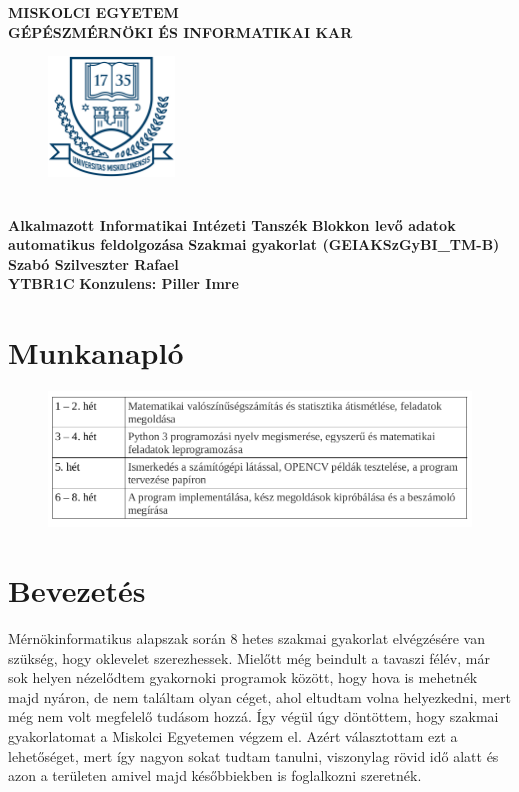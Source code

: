 \documentclass[a4paper,12pt]{article}
\begin{document}
\begin{center}
	\Large \textbf{MISKOLCI EGYETEM}
	\\
	\Large \textbf{GÉPÉSZMÉRNÖKI ÉS INFORMATIKAI KAR}
	\vskip 1cm
	\begin{figure}[h]
		\centering
		\includegraphics[width=0.3\textwidth]{logo}
	\end{figure}
	\\  
	\Large \textbf{Alkalmazott Informatikai Intézeti Tanszék}
	\vskip 1cm
	\huge \textbf{Blokkon levő adatok automatikus feldolgozása}
	\vskip 1cm
	\Large \textbf{Szakmai gyakorlat (GEIAKSzGyBI{\_}TM-B)}
	\vskip 1cm
	\huge \textbf{Szabó Szilveszter Rafael}
	\\
	\LARGE \textbf{YTBR1C}
	\vskip 1cm
	\Large \textbf{Konzulens: Piller Imre}

\end{center}

\newpage
\tableofcontents

\newpage 
\section{Munkanapló}
\begin{figure}[h]
	\centering
	\includegraphics[width=16cm]{munka}
	
\end{figure}

\newpage
\section{Bevezetés}
Mérnökinformatikus alapszak során 8 hetes szakmai gyakorlat elvégzésére van szükség, hogy  oklevelet szerezhessek. Mielőtt még beindult a tavaszi félév, már sok helyen nézelődtem gyakornoki programok között, hogy hova is mehetnék majd nyáron, de nem találtam olyan céget, ahol eltudtam volna helyezkedni, mert még nem volt megfelelő tudásom hozzá. Így végül úgy döntöttem, hogy szakmai gyakorlatomat a Miskolci Egyetemen végzem el. Azért választottam ezt a lehetőséget, mert így nagyon sokat tudtam tanulni, viszonylag rövid idő alatt és azon a területen amivel majd későbbiekben is foglalkozni szeretnék. 
 
\end{document}
